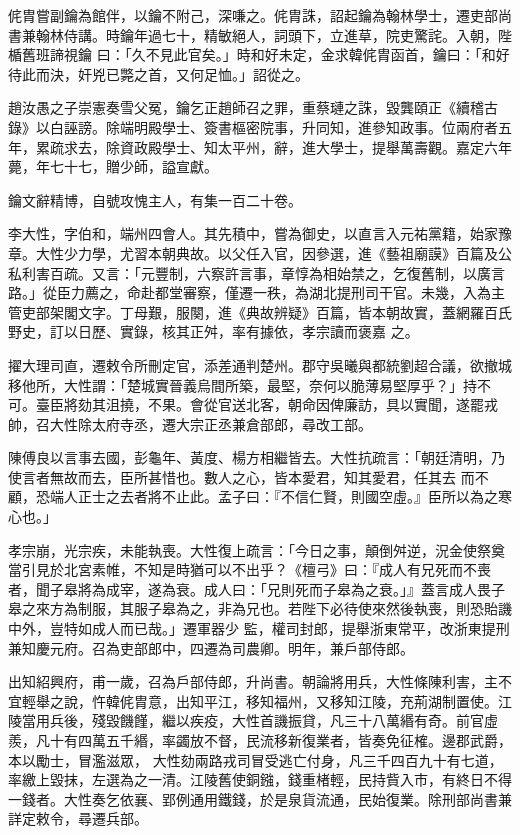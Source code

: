 \begin{pinyinscope}
 侂胄嘗副鑰為館伴，以鑰不附己，深嗛之。侂胄誅，詔起鑰為翰林學士，遷吏部尚書兼翰林侍講。時鑰年過七十，精敏絕人，詞頭下，立進草，院吏驚詫。入朝，陛楯舊班諦視鑰
 曰：「久不見此官矣。」時和好未定，金求韓侂胄函首，鑰曰：「和好待此而決，奸兇已斃之首，又何足恤。」詔從之。



 趙汝愚之子崇憲奏雪父冤，鑰乞正趙師召之罪，重蔡璉之誅，毀龔頤正《續稽古錄》以白誣謗。除端明殿學士、簽書樞密院事，升同知，進參知政事。位兩府者五年，累疏求去，除資政殿學士、知太平州，辭，進大學士，提舉萬壽觀。嘉定六年薨，年七十七，贈少師，謚宣獻。



 鑰文辭精博，自號攻愧主人，有集一百二十卷。



 李大性，字伯和，端州四會人。其先積中，嘗為御史，以直言入元祐黨籍，始家豫章。大性少力學，尤習本朝典故。以父任入官，因參選，進《藝祖廟謨》百篇及公私利害百疏。又言：「元豐制，六察許言事，章惇為相始禁之，乞復舊制，以廣言路。」從臣力薦之，命赴都堂審察，僅遷一秩，為湖北提刑司干官。未幾，入為主管吏部架閣文字。丁母艱，服闋，進《典故辨疑》百篇，皆本朝故實，蓋網羅百氏野史，訂以日歷、實錄，核其正舛，率有據依，孝宗讀而褒嘉
 之。



 擢大理司直，遷敕令所刪定官，添差通判楚州。郡守吳曦與都統劉超合議，欲撤城移他所，大性謂：「楚城實晉義烏間所築，最堅，奈何以脆薄易堅厚乎？」持不可。臺臣將劾其沮撓，不果。會從官送北客，朝命因俾廉訪，具以實聞，遂罷戎帥，召大性除太府寺丞，遷大宗正丞兼倉部郎，尋改工部。



 陳傅良以言事去國，彭龜年、黃度、楊方相繼皆去。大性抗疏言：「朝廷清明，乃使言者無故而去，臣所甚惜也。數人之心，皆本愛君，知其愛君，任其去
 而不顧，恐端人正士之去者將不止此。孟子曰：『不信仁賢，則國空虛。』臣所以為之寒心也。」



 孝宗崩，光宗疾，未能執喪。大性復上疏言：「今日之事，顛倒舛逆，況金使祭奠當引見於北宮素帷，不知是時猶可以不出乎？《檀弓》曰：『成人有兄死而不喪者，聞子皋將為成宰，遂為衰。成人曰：「兄則死而子皋為之衰。」』蓋言成人畏子皋之來方為制服，其服子皋為之，非為兄也。若陛下必待使來然後執喪，則恐貽譏中外，豈特如成人而已哉。」遷軍器少
 監，權司封郎，提舉浙東常平，改浙東提刑兼知慶元府。召為吏部郎中，四遷為司農卿。明年，兼戶部侍郎。



 出知紹興府，甫一歲，召為戶部侍郎，升尚書。朝論將用兵，大性條陳利害，主不宜輕舉之說，忤韓侂胄意，出知平江，移知福州，又移知江陵，充荊湖制置使。江陵當用兵後，殘毀饑饉，繼以疾疫，大性首譏振貸，凡三十八萬緡有奇。前官虛羨，凡十有四萬五千緡，率蠲放不督，民流移新復業者，皆奏免征榷。邊郡武爵，本以勵士，冒濫滋眾，
 大性劾兩路戎司冒受逃亡付身，凡三千四百九十有七道，率繳上毀抹，左選為之一清。江陵舊使銅鏹，錢重楮輕，民持貲入市，有終日不得一錢者。大性奏乞依襄、郢例通用鐵錢，於是泉貨流通，民始復業。除刑部尚書兼詳定敕令，尋遷兵部。




\end{pinyinscope}
